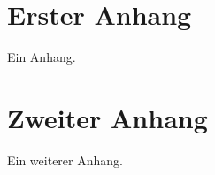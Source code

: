 \section{Erster Anhang}
\label{sec:Anhang_1}
Ein Anhang.


\section{Zweiter Anhang}
\label{sec:Anhang_2}
Ein weiterer Anhang.

